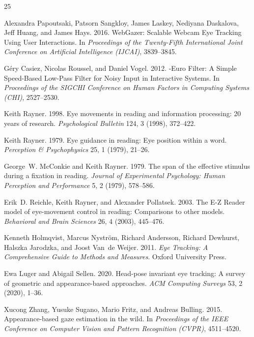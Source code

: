 \documentclass[10pt,twocolumn]{article}
\begin{document}
\begin{thebibliography}{25}

Alexandra Papoutsaki, Patsorn Sangkloy, James Laskey, Nediyana Daskalova, Jeff Huang, and James Hays. 2016.
\newblock WebGazer: Scalable Webcam Eye Tracking Using User Interactions.
\newblock In \emph{Proceedings of the Twenty-Fifth International Joint Conference on Artificial Intelligence (IJCAI)}, 3839--3845.

G{\'e}ry Casiez, Nicolas Roussel, and Daniel Vogel. 2012.
-Euro Filter: A Simple Speed-Based Low-Pass Filter for Noisy Input in Interactive Systems.
\newblock In \emph{Proceedings of the SIGCHI Conference on Human Factors in Computing Systems (CHI)}, 2527--2530.

Keith Rayner. 1998.
\newblock Eye movements in reading and information processing: 20 years of research.
\newblock \emph{Psychological Bulletin} 124, 3 (1998), 372--422.

Keith Rayner. 1979.
\newblock Eye guidance in reading: Eye position within a word.
\newblock \emph{Perception \& Psychophysics} 25, 1 (1979), 21--26.

George~W. McConkie and Keith Rayner. 1979.
\newblock The span of the effective stimulus during a fixation in reading.
\newblock \emph{Journal of Experimental Psychology: Human Perception and Performance} 5, 2 (1979), 578--586.

Erik~D. Reichle, Keith Rayner, and Alexander Pollatsek. 2003.
\newblock The E-Z Reader model of eye-movement control in reading: Comparisons to other models.
\newblock \emph{Behavioral and Brain Sciences} 26, 4 (2003), 445--476.

Kenneth Holmqvist, Marcus Nystr{\"o}m, Richard Andersson, Richard Dewhurst, Halszka Jarodzka, and Joost Van~de Weijer. 2011.
\newblock \emph{Eye Tracking: A Comprehensive Guide to Methods and Measures}.
\newblock Oxford University Press.

Ewa Luger and Abigail Sellen. 2020.
\newblock Head-pose invariant eye tracking: A survey of geometric and appearance-based approaches.
\newblock \emph{ACM Computing Surveys} 53, 2 (2020), 1--36.

Xucong Zhang, Yusuke Sugano, Mario Fritz, and Andreas Bulling. 2015.
\newblock Appearance-based gaze estimation in the wild.
\newblock In \emph{Proceedings of the IEEE Conference on Computer Vision and Pattern Recognition (CVPR)}, 4511--4520.


\end{thebibliography}
\end{document}
